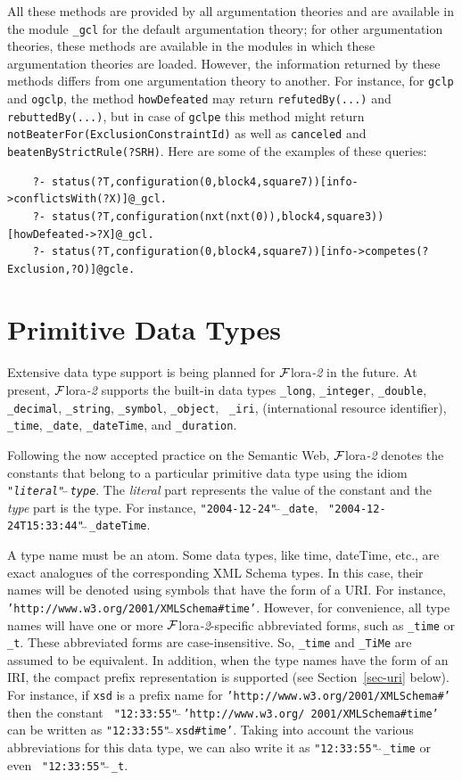 \documentclass[11pt]{article}
\newcommand{\FLORA}{{\mbox{\sc ${\cal F}${lora}\rm\emph{-2}}}\xspace}
\begin{document}
All these methods are provided by all argumentation theories and are
available in the module {\tt \_gcl} for the default argumentation
theory; for other argumentation theories, these methods are available in
the modules in which these argumentation theories are loaded.
However,
the information returned by these methods differs from one argumentation theory
to another. For instance, for {\tt gclp} and {\tt ogclp}, the method
{\tt howDefeated} may return {\tt refutedBy(...)} and {\tt
  rebuttedBy(...)}, but in case of {\tt gclpe} this method might return
{\tt notBeaterFor(ExclusionConstraintId)} as well as \texttt{canceled} and
\texttt{beatenByStrictRule(?SRH)}.    
Here are some of the examples of these queries:
\begin{verbatim}
    ?- status(?T,configuration(0,block4,square7))[info->conflictsWith(?X)]@_gcl.
    ?- status(?T,configuration(nxt(nxt(0)),block4,square3))[howDefeated->?X]@_gcl.
    ?- status(?T,configuration(0,block4,square7))[info->competes(?Exclusion,?O)]@gcle.
\end{verbatim}


\section{Primitive Data Types}\label{sec-data-types}

Extensive data type support is being planned for \FLORA in the future.
At present, \FLORA supports the built-in data types
{\tt \_long}, \texttt{\_integer},
{\tt \_double},  \texttt{\_decimal},
\texttt{\_string}, {\tt \_symbol}, {\tt \_object}, {\tt
  \_iri}, (international resource identifier), {\tt \_time}, {\tt \_date},
{\tt \_dateTime}, and {\tt \_duration}.

Following the now accepted practice on the Semantic Web, \FLORA denotes the
constants that belong to a particular primitive data type using the idiom
{\tt "\emph{literal}"$\hat{~}\hat{~}$\emph{type}}. The \emph{literal} part
represents the value of the constant and the \emph{type} part is the
type. For instance, {\tt "2004-12-24"$\hat{~}\hat{~}$\_date}, {\tt
  "2004-12-24T15:33:44"$\hat{~}\hat{~}$\_dateTime}.

A type name must be an atom.
Some data types, like time, dateTime, etc., are exact analogues of the
corresponding XML Schema types. In this case, their names will be denoted
using symbols that have the form of a URI. For instance,
{\tt 'http://www.w3.org/2001/XMLSchema\#time'}.  However, for convenience,
all type names will have one or more \FLORA-specific abbreviated forms, such as
{\tt \_time} or {\tt \_t}. These abbreviated forms are
case-insensitive. So, {\tt \_time} and
{\tt \_TiMe} are assumed to be equivalent. In addition, when the type names have
the form of an IRI, the compact prefix representation is supported (see
Section~\ref{sec-uri} below). For
instance, if {\tt xsd}  is a prefix name for
{\tt 'http://www.w3.org/2001/XMLSchema\#'} 
then the constant {\tt
  "12:33:55"$\hat{~}\hat{~}$'http://www.w3.org/ 2001/XMLSchema\#time'}  can be written as
{\tt "12:33:55"$\hat{~}\hat{~}$xsd\#time'}. Taking into account the
various abbreviations for this data type, we can also write it as
{\tt "12:33:55"$\hat{~}\hat{~}$\_time} or even {\tt
  "12:33:55"$\hat{~}\hat{~}$\_t}.
\end{document}
